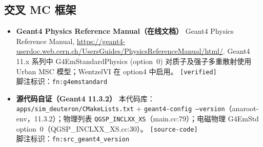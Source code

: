 \documentclass[a4paper, 11pt]{article}
\begin{document}
\subsection{交叉 MC 框架}

\begin{itemize}[leftmargin=2em,itemsep=3pt]

\item \textbf{Geant4 Physics Reference Manual（在线文档）} \quad
Geant4 Physics Reference Manual,
\url{https://geant4-userdoc.web.cern.ch/UsersGuides/PhysicsReferenceManual/html/}.
Geant4 11.x 系列中 G4EmStandardPhysics (option~0) 对质子及强子多重散射使用 Urban MSC 模型；WentzelVI 在 option4 中启用。
\texttt{[verified]}
\\
脚注标识：\texttt{fn:g4emstandard}

\item \textbf{源代码自证（Geant4 11.3.2）} \quad
本代码库：\texttt{apps/sim\_deuteron/CMakeLists.txt} + \texttt{geant4-config --version}（anaroot-env，11.3.2）；物理列表 \texttt{QGSP\_INCLXX\_XS}（main.cc:79）；电磁物理 G4EmStd option~0（QGSP\_INCLXX\_XS.cc:30）。
\texttt{[source-code]}
\\
脚注标识：\texttt{fn:src\_geant4\_version}

\end{itemize}
\end{document}
